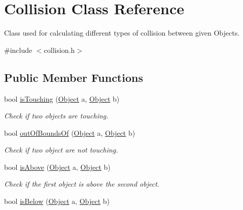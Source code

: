 \hypertarget{classCollision}{}\section{Collision Class Reference}
\label{classCollision}


Class used for calculating different types of collision between given Objects.  




{\ttfamily \#include $<$collision.\+h$>$}

\subsection*{Public Member Functions}
\begin{DoxyCompactItemize}
\item 
bool \hyperlink{classCollision_ae005eb1d857f6127b2673aecacbbd03f}{is\+Touching} (\hyperlink{classObject}{Object} a, \hyperlink{classObject}{Object} b)\hypertarget{classCollision_ae005eb1d857f6127b2673aecacbbd03f}{}\label{classCollision_ae005eb1d857f6127b2673aecacbbd03f}

\begin{DoxyCompactList}\small\item\em Check if two objects are touching. \end{DoxyCompactList}\item 
bool \hyperlink{classCollision_a4fae301767751ae007e953d1d2f49e7b}{out\+Of\+Bounds\+Of} (\hyperlink{classObject}{Object} a, \hyperlink{classObject}{Object} b)\hypertarget{classCollision_a4fae301767751ae007e953d1d2f49e7b}{}\label{classCollision_a4fae301767751ae007e953d1d2f49e7b}

\begin{DoxyCompactList}\small\item\em Check if two object are not touching. \end{DoxyCompactList}\item 
bool \hyperlink{classCollision_aecbf1758ca3a93a39568dbdf87213f20}{is\+Above} (\hyperlink{classObject}{Object} a, \hyperlink{classObject}{Object} b)\hypertarget{classCollision_aecbf1758ca3a93a39568dbdf87213f20}{}\label{classCollision_aecbf1758ca3a93a39568dbdf87213f20}

\begin{DoxyCompactList}\small\item\em Check if the first object is above the second object. \end{DoxyCompactList}\item 
bool \hyperlink{classCollision_ad5414ecc098c7d63155aea827c7d68b1}{is\+Below} (\hyperlink{classObject}{Object} a, \hyperlink{classObject}{Object} b)\hypertarget{classCollision_ad5414ecc098c7d63155aea827c7d68b1}{}\label{classCollision_ad5414ecc098c7d63155aea827c7d68b1}


\end{DoxyCompactItemize}
